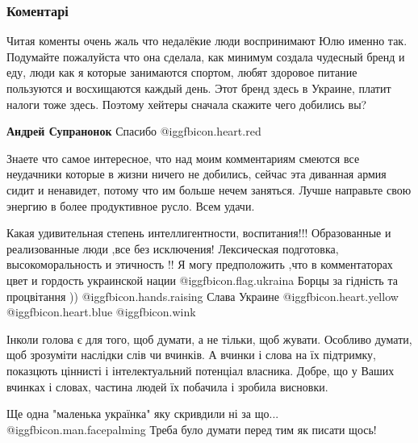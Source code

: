  
 
 
 
 
\subsubsection{Коментарі}
\label{sec:18_10_2021.fb.privalova_julia.ukraina.yaro.1.stranichka_patriotizm.cmt}

\begin{itemize} %

Читая коменты очень жаль что недалёкие люди воспринимают Юлю именно так.
Подумайте пожалуйста что она сделала, как минимум создала чудесный бренд и еду,
люди как я которые занимаются спортом, любят здоровое питание пользуются и
восхищаются каждый день. Этот бренд здесь в Украине, платит налоги тоже здесь.
Поэтому хейтеры сначала скажите чего добились вы?

\begin{itemize} %
\textbf{Андрей Супранонок} Спасибо @igg{fbicon.heart.red}


Знаете что самое интересное, что над моим комментариям смеются все неудачники
которые в жизни ничего не добились, сейчас эта диванная армия
сидит и ненавидет, потому что им больше нечем заняться. Лучше
направьте свою энергию в более продуктивное русло. Всем удачи.

\end{itemize} %


\obeycr
Какая удивительная степень интеллигентности, воспитания!!!
Образованные и реализованные люди ,все без исключения!
Лексическая подготовка,
высокоморальность и этичность !!
Я могу предположить ,что в комментаторах цвет и гордость украинской нации @igg{fbicon.flag.ukraina}
Борцы за гідність та процвітання )) @igg{fbicon.hands.raising} 
Слава Украине @igg{fbicon.heart.yellow}  @igg{fbicon.heart.blue} 
 @igg{fbicon.wink} 
\restorecr


Інколи голова є для того, щоб думати, а не тільки, щоб жувати. Особливо думати,
щоб зрозуміти наслідки слів чи вчинків. А вчинки і слова на їх підтримку,
показцють ціннисті і інтелектуальний потенціал власника. Добре, що у Ваших
вчинках і словах, частина людей їх побачила і зробила висновки.


Ще одна "маленька українка" яку скривдили ні за що...  @igg{fbicon.man.facepalming} 
Треба було думати перед тим як писати щось!

\end{itemize} %
